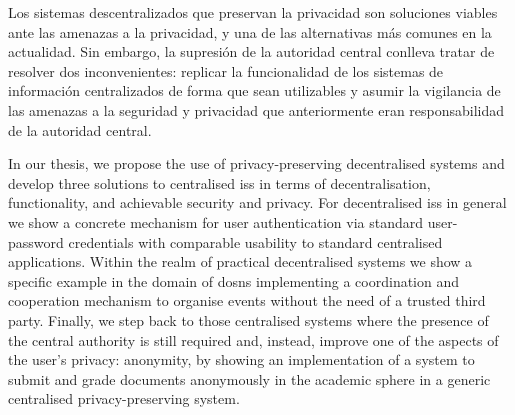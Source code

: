     Los sistemas descentralizados que preservan la privacidad son soluciones viables  
    ante las amenazas a la privacidad, y una de las alternativas más comunes en 
    la actualidad. Sin embargo, la supresión de la autoridad central conlleva tratar 
    de resolver dos inconvenientes: replicar la funcionalidad de los sistemas 
    de información centralizados de forma que sean utilizables y asumir la vigilancia  
    de las amenazas a la seguridad y privacidad que anteriormente eran responsabilidad 
    de la autoridad central.
    
    In our thesis, we propose the use of privacy-preserving decentralised systems 
    and develop three solutions to centralised \aclp*{is} in terms of decentralisation, 
    functionality, and achievable security and privacy. For decentralised \aclp*{is} 
    in general we show a concrete mechanism for user authentication via standard 
    user-password credentials with comparable usability to standard centralised 
    applications. Within the realm of practical decentralised systems we show a 
    specific example in the domain of \aclp*{dosn} implementing a coordination and 
    cooperation mechanism to organise events without the need of a trusted third 
    party. Finally, we step back to those centralised systems where the presence 
    of the central authority is still required and, instead, improve one of the 
    aspects of the user's privacy: anonymity, by showing an implementation of a 
    system to submit and grade documents anonymously in the academic sphere in a 
    generic centralised privacy-preserving system.
    
